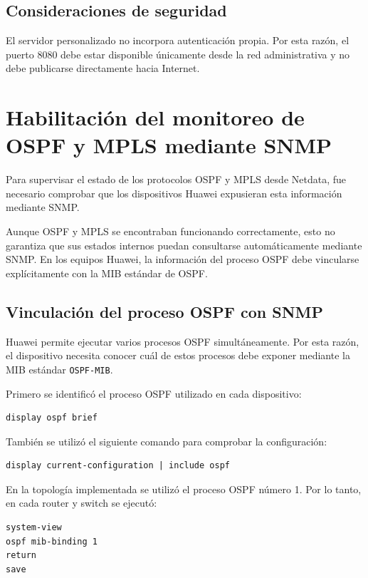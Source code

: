 \subsection{Consideraciones de seguridad}

El servidor personalizado no incorpora autenticación propia. Por esta razón,
el puerto 8080 debe estar disponible únicamente desde la red administrativa y
no debe publicarse directamente hacia Internet.


\section{Habilitación del monitoreo de OSPF y MPLS mediante SNMP}

Para supervisar el estado de los protocolos OSPF y MPLS desde Netdata, fue necesario comprobar que los dispositivos Huawei expusieran esta información mediante SNMP.

Aunque OSPF y MPLS se encontraban funcionando correctamente, esto no garantiza que sus estados internos puedan consultarse automáticamente mediante SNMP. En los equipos Huawei, la información del proceso OSPF debe vincularse explícitamente con la MIB estándar de OSPF. \cite{netdata46}

\subsection{Vinculación del proceso OSPF con SNMP}

Huawei permite ejecutar varios procesos OSPF simultáneamente. Por esta razón, el dispositivo necesita conocer cuál de estos procesos debe exponer mediante la MIB estándar \texttt{OSPF-MIB}. \cite{netdata25}

Primero se identificó el proceso OSPF utilizado en cada dispositivo:

\begin{lstlisting}[style=terminal]
display ospf brief
\end{lstlisting}

También se utilizó el siguiente comando para comprobar la configuración:

\begin{lstlisting}[style=terminal]
display current-configuration | include ospf
\end{lstlisting}

En la topología implementada se utilizó el proceso OSPF número 1. Por lo tanto, en cada router y switch se ejecutó:

\begin{lstlisting}[style=terminal]
system-view
ospf mib-binding 1
return
save
\end{lstlisting}

